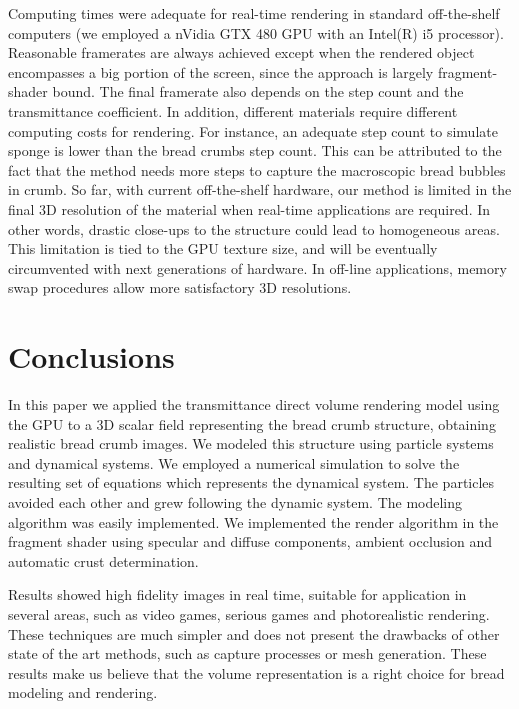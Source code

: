 
Computing times were adequate for real-time rendering in standard off-the-shelf computers (we employed a nVidia GTX 480 GPU with an Intel(R) i5 processor).
Reasonable framerates are always achieved except when the rendered object encompasses a big portion of the screen, since the approach is largely fragment-shader bound.
The final framerate also depends on the step count and the transmittance coefficient.
In addition, different materials require different computing costs for rendering.
For instance, an adequate step count to simulate sponge is lower than the bread crumbs step count.
This can be attributed to the fact that the method needs more steps to capture the macroscopic bread bubbles in crumb.
So far, with current off-the-shelf hardware, our method is limited in the final 3D resolution of the material when real-time applications are required.
In other words, drastic close-ups to the structure could lead to homogeneous areas.
This limitation is tied to the GPU texture size, and will be eventually circumvented with next generations of hardware.
In off-line applications, memory swap procedures allow more satisfactory 3D resolutions.


\section*{Conclusions}

In this paper we applied the transmittance direct volume rendering model using the GPU to a 3D scalar field representing the bread crumb structure, obtaining realistic bread crumb images.
We modeled this structure using particle systems and dynamical systems.
We employed a numerical simulation to solve the resulting set of equations which represents the dynamical system. 
The particles avoided each other and grew following the dynamic system.
The modeling algorithm was easily implemented. 
We implemented the render algorithm in the fragment shader using specular and diffuse components, ambient occlusion and automatic crust determination.

Results showed high fidelity images in real time, suitable for application in several areas, such as video games, serious games \cite{Susi2007} and photorealistic rendering. 
These techniques are much simpler and does not present the drawbacks of other state of the art methods, such as capture processes or mesh generation.
These results make us believe that the volume representation is a right choice for bread modeling and rendering.

